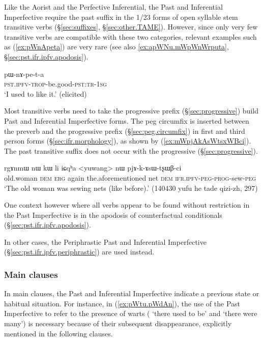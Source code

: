 Like the Aorist and the Perfective Inferential, the Past and Inferential Imperfective require the past suffix  in the 1/2\fl{}3 forms of open syllable stem transitive verbs (§\ref{sec:suffixes}, §\ref{sec:other.TAME}). However, since only very few transitive verbs are compatible with these two categories, relevant examples such as (\ref{ex:pWnApeta}) are very rare (see also \ref{ex:apWNu.mWpWnWrputa}, §\ref{sec:pst.ifr.ipfv.apodosis}).

\begin{exe}
\ex \label{ex:pWnApeta}
\gll pɯ-nɤ-pe-t-a \\
\textsc{pst}.\textsc{ipfv}-\textsc{trop}-be.good-\textsc{pst}:\textsc{tr}-\textsc{1sg} \\
\glt `I used to like it.' (elicited)
\end{exe}


Most transitive verbs need to take the progressive  prefix (§\ref{sec:progressive}) build Past and Inferential Imperfective forms. The peg circumfix  is inserted between the  preverb and the progressive prefix (§\ref{sec:peg.circumfix}) in first and third person forms (§\ref{sec:ifr.morphology}), as shown by (\ref{ex:mWpjAkAsWtsxWBci}). The past transitive suffix  does not occur with the progressive (§\ref{sec:progressive}).

\begin{exe}
\ex \label{ex:mWpjAkAsWtsxWBci}
\gll  rgɤnmɯ nɯ kɯ li iɕqʰa <yuwang> nɯ pjɤ-k-ɤsɯ-tʂɯβ-ci \\
old.woman \textsc{dem} \textsc{erg} again the.aforementioned net \textsc{dem} \textsc{ifr}.\textsc{ipfv}-\textsc{peg}-\textsc{prog}-sew-\textsc{peg} \\
\glt `The old woman was sewing nets (like before).' (140430 yufu he tade qizi-zh, 297)
\end{exe}

One context however where all verbs appear to be found without restriction in the Past Imperfective is in the apodosis of counterfactual conditionals (§\ref{sec:pst.ifr.ipfv.apodosis}).

In other cases, the Periphrastic Past and Inferential Imperfective (§\ref{sec:pst.ifr.ipfv.periphrastic}) are used instead.
 
\subsubsection{Main clauses} \label{sec:pst.ifr.ipfv.main}
In main clauses, the Past and Inferential Imperfective indicate a previous state or habitual situation. For instance, in (\ref{ex:pWtu.pWdAn}), the use of the Past Imperfective to refer to the presence of warts ( `there used to be' and  `there were many') is necessary because of their subsequent disappearance, explicitly mentioned in the following clauses.

